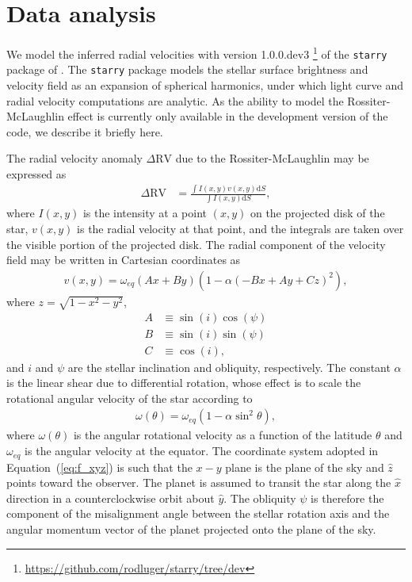 \documentclass[twocolumn]{aastex63}
\begin{document}
\section{Data analysis}
\label{sec:analysis}

We model the inferred radial velocities with version 1.0.0.dev3%
\footnote{\url{https://github.com/rodluger/starry/tree/dev}}%
of the \texttt{starry} package of \citet{Luger19}. The \texttt{starry} package models the stellar surface brightness and velocity field as an expansion of spherical harmonics, under which light curve and radial velocity computations are analytic. As the ability to model the Rossiter-McLaughlin effect is currently only available in the development version of the code, we describe it briefly here.

The radial velocity anomaly $\Delta\mathrm{RV}$ due to the Rossiter-McLaughlin may be expressed as \citep[e.g.][]{Gimenez06}
%
\begin{align}
    \label{eq:DeltaRV}
    \Delta\mathrm{RV} &= \frac{\int I(x, y) v(x, y) \mathrm{d}S}{\int I(x, y)\mathrm{d}S},
\end{align}
%
where $I(x,y)$ is the intensity at a point $(x, y)$ on the projected disk of the star, $v(x, y)$ is the radial velocity at that point, and the integrals are taken over the visible portion of the projected disk.
The radial component of the velocity field may be written in Cartesian coordinates as \citep[e.g.][]{Short18}
%
\begin{align}
\label{eq:f_xyz}
v(x, y) = \omega_{eq}(Ax + By)\left(1 - \alpha(-Bx + Ay + Cz)^2\right),
\end{align}
%
where $z=\sqrt{1 - x^2 - y^2}$, 
%
\begin{align}
    A &\equiv \sin(i)\cos(\psi) \nonumber \\
    B &\equiv \sin(i)\sin(\psi) \nonumber \\
    C &\equiv \cos(i),
\end{align}
%
and $i$ and $\psi$ are the stellar inclination and obliquity, respectively. 
The constant $\alpha$ is the linear shear due to differential rotation, whose
effect is to scale the rotational angular velocity of the star according to
%
\begin{align}
\omega(\theta) = \omega_{eq}(1 - \alpha \sin^2\theta),
\end{align}
%
where $\omega(\theta)$ is the angular rotational velocity as a function of the latitude $\theta$ and $\omega_{eq}$ is the angular velocity at the equator. 
The coordinate system adopted in Equation~(\ref{eq:f_xyz}) is such that the $x-y$ plane is the plane of the sky and $\hat{z}$ points toward the observer. The planet is assumed to transit the star along the $\hat{x}$ direction in a counterclockwise orbit about $\hat{y}$. The obliquity $\psi$ is therefore the component of the misalignment angle between the stellar rotation axis and the angular momentum vector of the planet projected onto the plane of the sky.
\end{document}
